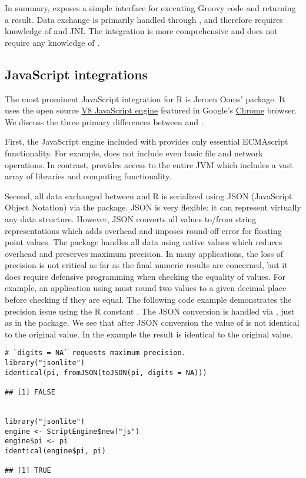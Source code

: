 In summary,  exposes a simple interface for executing Groovy code and returning a result. Data exchange is primarily handled through , and therefore requires knowledge of  and JNI. The  integration is more comprehensive and does not require any knowledge of .

\hypertarget{javascriptintegrations}{\subsection{JavaScript integrations}}

The most prominent JavaScript integration for R is Jeroen Ooms'  package. It uses the open source \href{https://developers.google.com/v8/}{V8 JavaScript engine} featured in Google's \href{https://www.google.com/chrome/browser/features.html}{Chrome} browser. We discuss the three primary differences between  and .

First, the JavaScript engine included with  provides only essential ECMAscript functionality. For example,  does not include even basic file and network operations. In contrast,  provides access to the entire JVM which includes a vast array of libraries and computing functionality.

Second, all data exchanged between  and R is serialized using JSON (JavaScript Object Notation) via the  package. JSON is very flexible; it can represent virtually any data structure. However, JSON converts all values to/from string representations which adds overhead and imposes round-off error for floating point values. The  package handles all data using native values which reduces overhead and preserves maximum precision. In many applications, the loss of precision is not critical as far as the final numeric results are concerned, but it does require defensive programming when checking the equality of values. For example, an application using  must round two values to a given decimal place before checking if they are equal. The following code example demonstrates the precision issue using the R constant . The JSON conversion is handled via , just as in the  package. We see that after JSON conversion the value of  is not identical to the original value. In the  example the result is identical to the original value.

\begin{verbatim}
# `digits = NA` requests maximum precision.
library("jsonlite")
identical(pi, fromJSON(toJSON(pi, digits = NA)))

## [1] FALSE


library("jsonlite")
engine <- ScriptEngine$new("js")
engine$pi <- pi
identical(engine$pi, pi)

## [1] TRUE
\end{verbatim}

